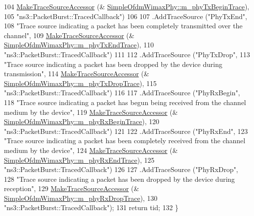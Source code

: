 \begin{DoxyCode}
104                      \hyperlink{group__tracing_gab21a770b9855af4e8f69f7531ea4a6b0}{MakeTraceSourceAccessor} (&
      \hyperlink{classns3_1_1SimpleOfdmWimaxPhy_a21e5bdd806cdcf9776bf226d23fc98ca}{SimpleOfdmWimaxPhy::m\_phyTxBeginTrace}),
105                      \textcolor{stringliteral}{"ns3::PacketBurst::TracedCallback"})
106 
107     .AddTraceSource (\textcolor{stringliteral}{"PhyTxEnd"},
108                      \textcolor{stringliteral}{"Trace source indicating a packet has been completely transmitted over the channel"},
109                      \hyperlink{group__tracing_gab21a770b9855af4e8f69f7531ea4a6b0}{MakeTraceSourceAccessor} (&
      \hyperlink{classns3_1_1SimpleOfdmWimaxPhy_a25cc58eaaab4ca6692c29140562c709c}{SimpleOfdmWimaxPhy::m\_phyTxEndTrace}),
110                      \textcolor{stringliteral}{"ns3::PacketBurst::TracedCallback"})
111 
112     .AddTraceSource (\textcolor{stringliteral}{"PhyTxDrop"},
113                      \textcolor{stringliteral}{"Trace source indicating a packet has been dropped by the device during transmission"},
114                      \hyperlink{group__tracing_gab21a770b9855af4e8f69f7531ea4a6b0}{MakeTraceSourceAccessor} (&
      \hyperlink{classns3_1_1SimpleOfdmWimaxPhy_aebbb0af4dbce1a78fa142597a96b3910}{SimpleOfdmWimaxPhy::m\_phyTxDropTrace}),
115                      \textcolor{stringliteral}{"ns3::PacketBurst::TracedCallback"})
116 
117     .AddTraceSource (\textcolor{stringliteral}{"PhyRxBegin"},
118                      \textcolor{stringliteral}{"Trace source indicating a packet has begun being received from the channel medium by
       the device"},
119                      \hyperlink{group__tracing_gab21a770b9855af4e8f69f7531ea4a6b0}{MakeTraceSourceAccessor} (&
      \hyperlink{classns3_1_1SimpleOfdmWimaxPhy_a1681c13eaa52d28c39f2232b9148417d}{SimpleOfdmWimaxPhy::m\_phyRxBeginTrace}),
120                      \textcolor{stringliteral}{"ns3::PacketBurst::TracedCallback"})
121 
122     .AddTraceSource (\textcolor{stringliteral}{"PhyRxEnd"},
123                      \textcolor{stringliteral}{"Trace source indicating a packet has been completely received from the channel medium
       by the device"},
124                      \hyperlink{group__tracing_gab21a770b9855af4e8f69f7531ea4a6b0}{MakeTraceSourceAccessor} (&
      \hyperlink{classns3_1_1SimpleOfdmWimaxPhy_a02734dac1757daecf21e5c53fced860e}{SimpleOfdmWimaxPhy::m\_phyRxEndTrace}),
125                      \textcolor{stringliteral}{"ns3::PacketBurst::TracedCallback"})
126 
127     .AddTraceSource (\textcolor{stringliteral}{"PhyRxDrop"},
128                      \textcolor{stringliteral}{"Trace source indicating a packet has been dropped by the device during reception"},
129                      \hyperlink{group__tracing_gab21a770b9855af4e8f69f7531ea4a6b0}{MakeTraceSourceAccessor} (&
      \hyperlink{classns3_1_1SimpleOfdmWimaxPhy_a0dc52213d50436ee17875d8fee2671ce}{SimpleOfdmWimaxPhy::m\_phyRxDropTrace}),
130                      \textcolor{stringliteral}{"ns3::PacketBurst::TracedCallback"});
131   \textcolor{keywordflow}{return} tid;
132 \}
\end{DoxyCode}


